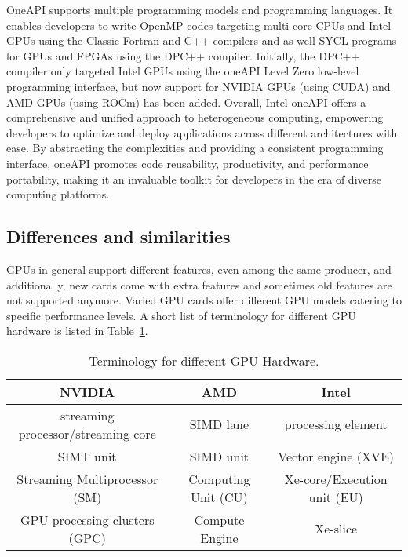 \par
OneAPI supports multiple programming models and programming languages.
It enables developers to write OpenMP codes targeting multi-core CPUs and Intel GPUs using the Classic Fortran and C++ compilers and as well SYCL programs for GPUs and FPGAs using the DPC++ compiler.
Initially, the DPC++ compiler only targeted Intel GPUs using the oneAPI Level Zero low-level programming interface, but now support for NVIDIA GPUs (using CUDA) and AMD GPUs (using ROCm) has been added.
Overall, Intel oneAPI offers a comprehensive and unified approach to heterogeneous computing, empowering developers to optimize and deploy applications across different architectures with ease.
By abstracting the complexities and providing a consistent programming interface, oneAPI promotes code reusability, productivity, and performance portability, making it an invaluable toolkit for developers in the era of diverse computing platforms.




\subsection{Differences and similarities}


\par
GPUs in general support different features, even among the same producer, and additionally, new cards come with extra features and sometimes old features are not supported anymore.
Varied GPU cards offer different GPU models catering to specific performance levels.
A short list of terminology for different GPU hardware is listed in Table~\ref{tbl:gpu_terminology_nvidia_amd_intel}.


\begin{table}[!h]
\centering\caption{Terminology for different GPU Hardware.}\label{tbl:gpu_terminology_nvidia_amd_intel}
\begin{tabular}{ |c|c|c| } 
\hline
\textbf{NVIDIA} & \textbf{AMD} & \textbf{Intel} \\
\hline
streaming processor/streaming core & SIMD lane & processing element \\
SIMT unit & SIMD unit & Vector engine (XVE) \\
Streaming Multiprocessor (SM) & Computing Unit (CU) & Xe-core/Execution unit (EU) \\
GPU processing clusters (GPC) & Compute Engine & Xe-slice \\
\hline
\end{tabular}
\end{table}


